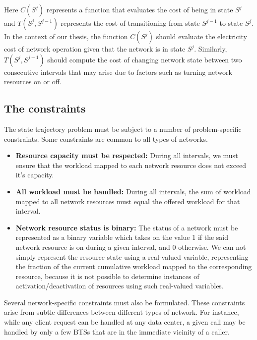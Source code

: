 Here $C(S^j)$ represents a function that evaluates the cost of being in state $S^j$ and $T(S^j,S^{j-1})$ represents the cost of transitioning from state $S^{j-1}$ to state $S^j$. In the context of our thesis, the function $C(S^j)$ should evaluate the electricity cost of network operation given that the network is in state $S^j$. Similarly, $T(S^j,S^{j-1})$ should compute the cost of changing network state between two consecutive intervals that may arise due to factors such as turning network resources on or off.

\subsection{The constraints}
\label{subsec:framework:constraints} %
The state trajectory problem must be subject to a number of problem-specific constraints. Some constraints are common to all types of networks. 

\begin{itemize}
\item \textbf{Resource capacity must be respected:} During all intervals, we must ensure that the workload mapped to each network resource does not exceed it's capacity.
\item \textbf{All workload must be handled:} During all intervals, the sum of workload mapped to all network resources must equal the offered workload for that interval.
\item \textbf{Network resource status is binary:} The status of a network must be represented as a binary variable which takes on the value 1 if the said network resource is on during a given interval, and 0 otherwise. We can not simply represent the resource state using a real-valued variable, representing the fraction of the current cumulative workload mapped to the corresponding resource, because it is not possible to determine instances of activation/deactivation of resources using such real-valued variables.
\end{itemize}

Several network-specific constraints must also be formulated. These constraints arise from subtle differences between different types of network. For instance, while any client request can be handled at any data center, a given call may be handled by only a few BTSs that are in the immediate vicinity of a caller.


